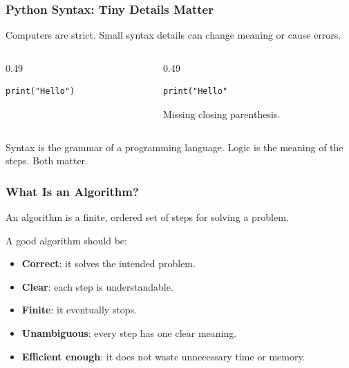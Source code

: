 \documentclass[aspectratio=169,10pt]{beamer}
\newcommand{\keyword}[1]{\textcolor{PrimaryBlue}{\textbf{#1}}}
\begin{document}
\begin{frame}[fragile]
\frametitle{Python Syntax: Tiny Details Matter}
\vspace{0.54cm}
Computers are strict. Small syntax details can change meaning or cause errors.
\vspace{0.35cm}
\begin{columns}[T,onlytextwidth]
\begin{column}{0.49\textwidth}
\begin{tcolorbox}[lecturebox,title=Correct]
\begin{lstlisting}[style=pycodelarge,frame=none,backgroundcolor=\color{LightGray},aboveskip=0pt,belowskip=0pt]
print("Hello")
\end{lstlisting}
\end{tcolorbox}
\end{column}
\begin{column}{0.49\textwidth}
\begin{tcolorbox}[lecturebox,title=Incorrect]
\begin{lstlisting}[style=pycodelarge,frame=none,backgroundcolor=\color{LightGray},aboveskip=0pt,belowskip=0pt]
print("Hello"
\end{lstlisting}
\tcblower
Missing closing parenthesis.
\end{tcolorbox}
\end{column}
\end{columns}
\vspace{0.2cm}
\begin{tcolorbox}[lecturebox,title=Checkpoint]
Syntax is the grammar of a programming language. Logic is the meaning of the steps. Both matter.
\end{tcolorbox}
\end{frame}


\begin{frame}
\frametitle{What Is an Algorithm?}
\vspace{0.85cm}
\begin{tcolorbox}[lecturebox,title=Key idea]
An algorithm is a finite, ordered set of steps for solving a problem.
\end{tcolorbox}
\vspace{0.18cm}
A good algorithm should be:
\begin{itemize}\setlength\itemsep{0.13cm}
  \item \keyword{Correct}: it solves the intended problem.
  \item \keyword{Clear}: each step is understandable.
  \item \keyword{Finite}: it eventually stops.
  \item \keyword{Unambiguous}: every step has one clear meaning.
  \item \keyword{Efficient enough}: it does not waste unnecessary time or memory.
\end{itemize}
\end{frame}
\end{document}
